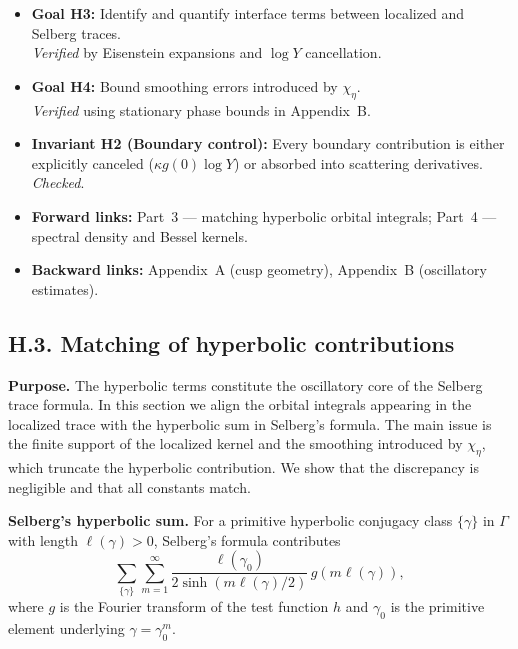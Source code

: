 \bigskip
\begin{auditblock}[H.2 — Audit]
\begin{itemize}
  \item \textbf{Goal H3:} Identify and quantify interface terms between localized and Selberg traces.\\
        \emph{Verified} by Eisenstein expansions and $\log Y$ cancellation.
  \item \textbf{Goal H4:} Bound smoothing errors introduced by $\chi_\eta$.\\
        \emph{Verified} using stationary phase bounds in Appendix~B.
  \item \textbf{Invariant H2 (Boundary control):} Every boundary contribution is either explicitly canceled 
        ($\kappa g(0)\log Y$) or absorbed into scattering derivatives.\\
        \emph{Checked}.
  \item \textbf{Forward links:} Part~3 — matching hyperbolic orbital integrals; Part~4 — 
        spectral density and Bessel kernels.
  \item \textbf{Backward links:} Appendix~A (cusp geometry), Appendix~B (oscillatory estimates).
\end{itemize}
\end{auditblock}

\subsection*{H.3. Matching of hyperbolic contributions}
\label{appH:hyperbolic}

\noindent\textbf{Purpose.}
The hyperbolic terms constitute the oscillatory core of the Selberg trace formula.  
In this section we align the orbital integrals appearing in the localized trace 
with the hyperbolic sum in Selberg’s formula. The main issue is the finite support 
of the localized kernel and the smoothing introduced by $\chi_\eta$, which truncate 
the hyperbolic contribution. We show that the discrepancy is negligible and that 
all constants match.

\medskip
\noindent\textbf{Selberg’s hyperbolic sum.}
For a primitive hyperbolic conjugacy class $\{\gamma\}$ in $\Gamma$ with length 
$\ell(\gamma)>0$, Selberg’s formula contributes
\[
\sum_{\{\gamma\}} \sum_{m=1}^\infty 
\frac{\ell(\gamma_0)}{2\sinh(m\ell(\gamma)/2)}\, g(m\ell(\gamma)),
\]
where $g$ is the Fourier transform of the test function $h$ and $\gamma_0$ is the 
primitive element underlying $\gamma=\gamma_0^m$.

